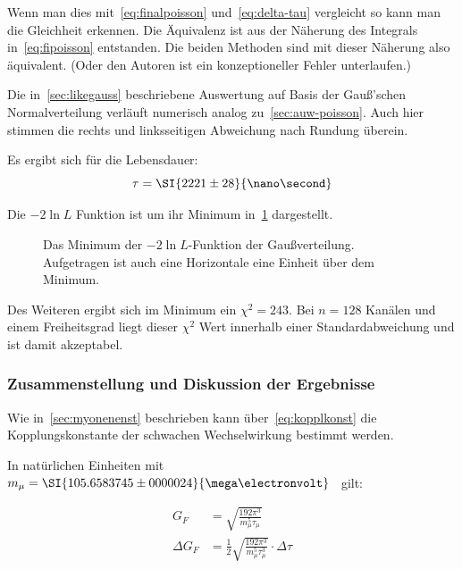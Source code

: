 \documentclass[slug=LM, room=Andreas-Schubert-Bau\,\ K\ 1A, supervisor=Anne-Sophie\ Berthold, coursedate=13.\ 12.\ 2019]{../../Lab_Report_LaTeX/lab_report}
\begin{document}
Wenn man dies mit~\ref{eq:finalpoisson} und~\ref{eq:delta-tau}
vergleicht so kann man die Gleichheit erkennen. Die Äquivalenz ist
aus der N\"aherung des Integrals in~\ref{eq:fipoisson}
entstanden. Die beiden Methoden sind mit dieser N\"aherung also
\"aquivalent. (Oder den Autoren ist ein konzeptioneller
Fehler unterlaufen.)

Die in~\ref{sec:likegauss} beschriebene Auswertung auf Basis der
Gauß'schen Normalverteilung verl\"auft numerisch analog
zu~\ref{sec:auw-poisson}. Auch hier stimmen die rechts und
linksseitigen Abweichung nach Rundung \"uberein.

Es ergibt sich f\"ur die Lebensdauer:
\begin{equation}
  \label{eq:result-poisson}
  \tau = \SI{2221\pm 28}{\nano\second}
\end{equation}

Die \(-2\ln{L}\) Funktion ist um ihr Minimum
in~\ref{fig:haupt-poisson} dargestellt.

\begin{figure}[h]\centering
  
  \caption{Das Minimum der \(-2\ln{L}\)-Funktion der
    Gaußverteilung. Aufgetragen ist auch eine Horizontale eine
    Einheit \"uber dem Minimum.}
  \label{fig:haupt-poisson}
\end{figure}

Des Weiteren ergibt sich im Minimum ein \(\chi^2=243\). Bei \(n=128\)
Kan\"alen und einem Freiheitsgrad liegt dieser \(\chi^2\) Wert
innerhalb einer Standardabweichung und ist damit akzeptabel.


\subsubsection{Zusammenstellung und Diskussion der Ergebnisse}
\label{sec:disk}

Wie in~\ref{sec:myonenenst} beschrieben kann
\"uber~\ref{eq:kopplkonst} die Kopplungskonstante der schwachen
Wechselwirkung bestimmt werden.

In nat\"urlichen Einheiten mit
\(m_\mu = \SI{105.6583745\pm
  0000024}{\mega\electronvolt}\)~\cite{codata} gilt:

\begin{align}
  \label{eq:couplingconstant}
  G_F &= \sqrt{\frac{192\pi^3}{m_\mu^5\tau_\mu}} \\
  \Delta G_F &=
  \frac{1}{2}\sqrt{\frac{192\pi^3}{m_\mu^5\tau_\mu^3}}\cdot \Delta \tau
\end{align}
\end{document}

